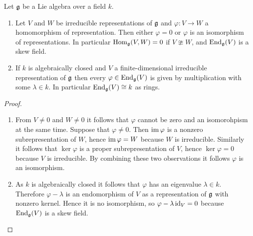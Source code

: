 \begin{lem}[Schur]
 Let $\mathfrak{g}$ be a Lie algebra over a field $k$.
 \begin{enumerate}
  \item
   Let $V$ and $W$ be irreducible representations of $\mathfrak{g}$ and $\varphi \colon V \to W$ a homomorphism of representation. Then either $\varphi = 0$ or $\varphi$ is an isomorphism of representations. In particular $\operatorname{Hom}_{\mathfrak{g}}(V,W) = 0$ if $V \ncong W$, and $\operatorname{End}_{\mathfrak{g}}(V)$ is a skew field.
  \item
   If $k$ is algebraically closed and $V$ a finite-dimensional irreducible representation of $\mathfrak{g}$ then every $\varphi \in \operatorname{End}_{\mathfrak{g}}(V)$ is given by multiplication with some $\lambda \in k$. In particular $\operatorname{End}_{\mathfrak{g}}(V) \cong k$ as rings.
 \end{enumerate}
\end{lem}
\begin{proof}
 \begin{enumerate}[leftmargin=*]
  \item
   From $V \neq 0$ and $W \neq 0$ it follows that $\varphi$ cannot be zero and an isomorohpism at the same time. Suppose that $\varphi \neq 0$. Then $\operatorname{im} \varphi$ is a nonzero subrepresentation of $W$, hence $\operatorname{im} \varphi = W$ because $W$ is irreducible. Similarly it follows that $\ker \varphi$ is a proper subrepresentation of $V$, hence $\ker \varphi = 0$ because $V$ is irreducible. By combining these two observations it follows $\varphi$ is an isomorphism.
  \item
   As $k$ is algebraically closed it follows that $\varphi$ has an eigenvalue $\lambda \in k$. Therefore $\varphi - \lambda$ is an endomorphism of $V$ as a representation of $\mathfrak{g}$ with nonzero kernel. Hence it is no isomorphism, so $\varphi - \lambda \operatorname{id}_V = 0$ because $\operatorname{End}_{\mathfrak{g}}(V)$ is a skew field.
  \qedhere
 \end{enumerate}
\end{proof}








